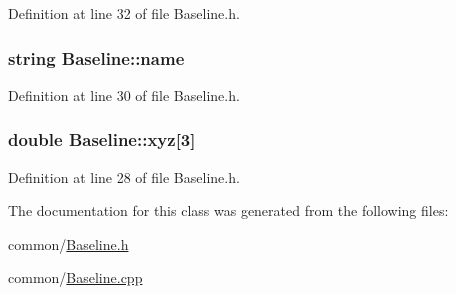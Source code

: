 Definition at line 32 of file Baseline.h.

\hypertarget{classBaseline_a2e756765673499ebf05fedaa1011f717}{
\subsubsection[{name}]{\setlength{\rightskip}{0pt plus 5cm}string {\bf Baseline::name}}}
\label{classBaseline_a2e756765673499ebf05fedaa1011f717}


Definition at line 30 of file Baseline.h.

\hypertarget{classBaseline_a433e589e07963e5bf6c3902795997ef2}{
\subsubsection[{xyz}]{\setlength{\rightskip}{0pt plus 5cm}double {\bf Baseline::xyz}\mbox{[}3\mbox{]}}}
\label{classBaseline_a433e589e07963e5bf6c3902795997ef2}


Definition at line 28 of file Baseline.h.



The documentation for this class was generated from the following files:\begin{DoxyCompactItemize}
\item 
common/\hyperlink{Baseline_8h}{Baseline.h}\item 
common/\hyperlink{Baseline_8cpp}{Baseline.cpp}\end{DoxyCompactItemize}
